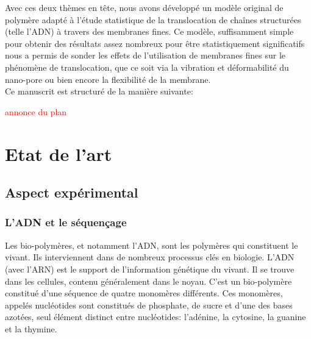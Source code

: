\documentclass[a4paper,11pt]{article}
\begin{document}
Avec ces deux thèmes en t\^{e}te, nous avons développé un modèle original de polymère adapté à l'étude statistique de la translocation de cha\^{i}nes structurées (telle l'ADN) à travers des membranes fines. Ce modèle, suffisamment simple pour obtenir des résultats assez nombreux pour \^{e}tre statistiquement significatifs nous a permis de sonder les effets de l'utilisation de membranes fines sur le phénomène de translocation, que ce soit via la vibration et déformabilité du nano-pore ou bien encore la flexibilité de la membrane.\\

Ce manuscrit est structuré de la manière suivante:


\textcolor{red}{annonce du plan}

\newpage

\tableofcontents



\newpage 

\section{Etat de l'art}

\subsection{Aspect expérimental}

\subsubsection{L'ADN et le séquençage}

Les bio-polymères, et notamment l'ADN, sont les polymères qui constituent le vivant. Ils interviennent dans de nombreux processus clés en biologie.  L'ADN (avec l'ARN) est le support de l'information génétique du vivant. Il se trouve dans les cellules, contenu généralement dans le noyau. C'est un bio-polymère constitué d'une séquence de quatre monomères différents. Ces monomères, appelés nucléotides sont constitués de phosphate, de sucre et d'une des bases azotées, seul élément distinct entre nucléotides: l'adénine, la cytosine, la guanine et la thymine. 
\end{document}
